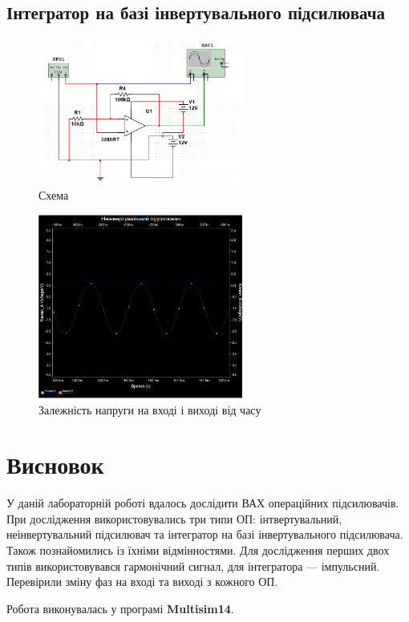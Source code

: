 \documentclass[
  ukrainian,
  14pt
]{extreport}
\begin{document}
\subsection{Інтегратор на базі інвертувального підсилювача}
\begin{figure}[H]
    \includegraphics[width=0.6\textwidth]{imgs/2-1.png}
    \centering
    \caption{Схема}
\end{figure}
\begin{figure}[H]
    \includegraphics[width=0.6\textwidth]{imgs/2-2.png}
    \centering
    \caption{Залежність напруги на вході і виході від часу}
\end{figure}

\section{Висновок}
У даній лабораторній роботі вдалось дослідити ВАХ
операційних підсилювачів. При дослідження використовувались три типи ОП:
інтвертувальний, неінвертувальний підсилювач та інтегратор на базі
інвертувального підсилювача. Також познайомились із їхніми відмінностями. Для дослідження перших двох типів
використовувався гармонічний сигнал, для інтегратора — імпульсний.
Перевірили зміну фаз на вході та виході з кожного ОП. 

Робота виконувалась у програмі \textbf{Multisim14}.
\end{document}
